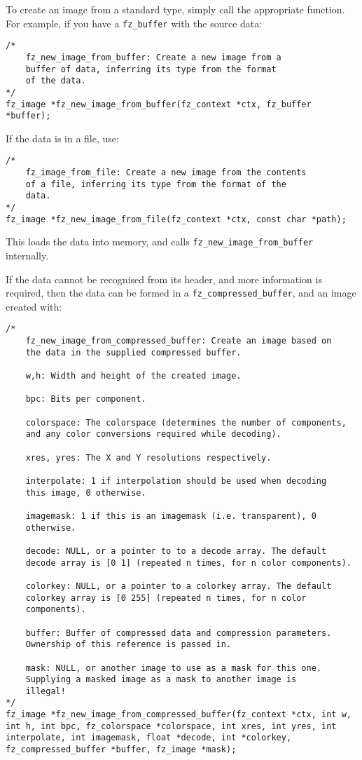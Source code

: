 \documentclass[oneside]{book}
\begin{document}
To create an image from a standard type, simply call the appropriate function. For example, if you have a \texttt{fz\_buffer} with the source data:

\begin{lstlisting}
/*
	fz_new_image_from_buffer: Create a new image from a
	buffer of data, inferring its type from the format
	of the data.
*/
fz_image *fz_new_image_from_buffer(fz_context *ctx, fz_buffer *buffer);
\end{lstlisting}

If the data is in a file, use:

\begin{lstlisting}
/*
	fz_image_from_file: Create a new image from the contents
	of a file, inferring its type from the format of the
	data.
*/
fz_image *fz_new_image_from_file(fz_context *ctx, const char *path);
\end{lstlisting}

This loads the data into memory, and calls \texttt{fz\_new\_image\_from\_buffer} internally.

If the data cannot be recognised from its header, and more information is required, then the data can be formed in a \texttt{fz\_compressed\_buffer}, and an image created with:

\begin{lstlisting}
/*
	fz_new_image_from_compressed_buffer: Create an image based on
	the data in the supplied compressed buffer.

	w,h: Width and height of the created image.

	bpc: Bits per component.

	colorspace: The colorspace (determines the number of components,
	and any color conversions required while decoding).

	xres, yres: The X and Y resolutions respectively.

	interpolate: 1 if interpolation should be used when decoding
	this image, 0 otherwise.

	imagemask: 1 if this is an imagemask (i.e. transparent), 0
	otherwise.

	decode: NULL, or a pointer to to a decode array. The default
	decode array is [0 1] (repeated n times, for n color components).

	colorkey: NULL, or a pointer to a colorkey array. The default
	colorkey array is [0 255] (repeated n times, for n color
	components).

	buffer: Buffer of compressed data and compression parameters.
	Ownership of this reference is passed in.

	mask: NULL, or another image to use as a mask for this one.
	Supplying a masked image as a mask to another image is
	illegal!
*/
fz_image *fz_new_image_from_compressed_buffer(fz_context *ctx, int w, int h, int bpc, fz_colorspace *colorspace, int xres, int yres, int interpolate, int imagemask, float *decode, int *colorkey, fz_compressed_buffer *buffer, fz_image *mask);
\end{lstlisting}
\end{document}
